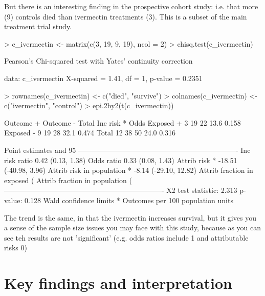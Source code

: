 \documentclass{article}
\begin{document}
But there is an interesting finding in the prospective cohort study: i.e. that more (9) controls died than ivermectin treatments (3). This is a subset of the main treatment trial study.

\begin{Schunk}
\begin{Sinput}
> c_ivermectin <- matrix(c(3, 19, 9, 19), ncol = 2)
> chisq.test(c_ivermectin)
\end{Sinput}
\begin{Soutput}
	Pearson's Chi-squared test with Yates' continuity correction

data:  c_ivermectin
X-squared = 1.41, df = 1, p-value = 0.2351
\end{Soutput}
\begin{Sinput}
> rownames(c_ivermectin) <- c("died", "survive")
> colnames(c_ivermectin) <- c("ivermectin", "control")
> epi.2by2(t(c_ivermectin))
\end{Sinput}
\begin{Soutput}
             Outcome +    Outcome -      Total        Inc risk *        Odds
Exposed +            3           19         22              13.6       0.158
Exposed -            9           19         28              32.1       0.474
Total               12           38         50              24.0       0.316

Point estimates and 95 %
-------------------------------------------------------------------
Inc risk ratio                               0.42 (0.13, 1.38)
Odds ratio                                   0.33 (0.08, 1.43)
Attrib risk *                                -18.51 (-40.98, 3.96)
Attrib risk in population *                  -8.14 (-29.10, 12.82)
Attrib fraction in exposed (%
Attrib fraction in population (%
-------------------------------------------------------------------
 X2 test statistic: 2.313 p-value: 0.128
 Wald confidence limits
 * Outcomes per 100 population units 
\end{Soutput}
\end{Schunk}

The trend is the same, in that the ivermectin increases survival, but it gives you a sense of the sample size issues you may face with this study, because as you can see teh results are not 'significant' (e.g. odds ratios include 1 and attributable risks 0)

\section{Key findings and interpretation}
\end{document}

